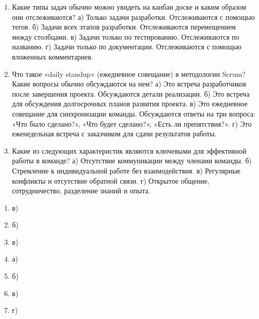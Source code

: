 \documentclass[letterpaper,10pt,russian]{sphinxmanual}
\begin{document}
\begin{enumerate}
\item {} 
\sphinxAtStartPar
Какие типы задач обычно можно увидеть на канбан доске и каким образом они отслеживаются?
а) Только задачи разработки. Отслеживаются с помощью тегов.
б) Задачи всех этапов разработки. Отслеживаются перемещением между столбцами.
в) Задачи только по тестированию. Отслеживаются по названию.
г) Задачи только по документации. Отслеживаются с помощью вложенных комментариев.

\item {} 
\sphinxAtStartPar
Что такое «daily stand\sphinxhyphen{}up» (ежедневное совещание) в методологии Scrum? Какие вопросы обычно обсуждаются на нем?
а) Это встреча разработчиков после завершения проекта. Обсуждаются детали реализации.
б) Это встреча для обсуждения долгосрочных планов развития проекта.
в) Это ежедневное совещание для синхронизации команды. Обсуждаются ответы на три вопроса: «Что было сделано?», «Что будет сделано?», «Есть ли препятствия?».
г) Это еженедельная встреча с заказчиком для сдачи результатов работы.

\item {} 
\sphinxAtStartPar
Какие из следующих характеристик являются ключевыми для эффективной работы в команде?
а) Отсутствие коммуникации между членами команды.
б) Стремление к индивидуальной работе без взаимодействия.
в) Регулярные конфликты и отсутствие обратной связи.
г) Открытое общение, сотрудничество, разделение знаний и опыта.

\end{enumerate}

\sphinxAtStartPar
{}
\begin{enumerate}
%
\item {} 
\sphinxAtStartPar
в)

\item {} 
\sphinxAtStartPar
б)

\item {} 
\sphinxAtStartPar
в)

\item {} 
\sphinxAtStartPar
а)

\item {} 
\sphinxAtStartPar
б)

\item {} 
\sphinxAtStartPar
в)

\item {} 
\sphinxAtStartPar
г)

\end{enumerate}
\end{document}

